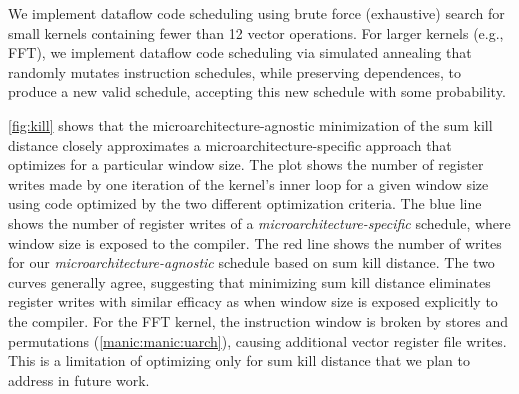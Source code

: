 We implement dataflow code scheduling using brute force (exhaustive) search
for small kernels containing fewer than 12 vector operations.  For larger
kernels (e.g., FFT), we implement dataflow code scheduling via simulated
annealing that randomly mutates instruction schedules, 
while preserving dependences, to produce a new valid schedule, accepting 
this new schedule with some probability.

\figMANICKill

\autoref{fig:kill} shows that the microarchitecture-agnostic minimization of
the sum kill distance closely approximates a microarchitecture-specific
approach that optimizes for a particular window size.
%
The plot shows the number of register writes made by one iteration of the
kernel's inner loop for a given window size using code optimized by the two
different optimization criteria. 
%
The blue line shows the number of register writes of a \emph{microarchitecture-specific} schedule,
where window size is exposed to the compiler.  The red line shows the number of writes
for our \emph{microarchitecture-agnostic} schedule based on sum kill distance.
%
The two curves generally agree, suggesting that minimizing sum kill distance eliminates
register writes with similar efficacy as when window size is exposed explicitly to the compiler.
%
For the FFT kernel, the instruction window is broken by stores and permutations (\autoref{manic:manic:uarch}),
causing additional vector register file writes.
This is a limitation of optimizing only for sum kill distance
that we plan to address in future work.
